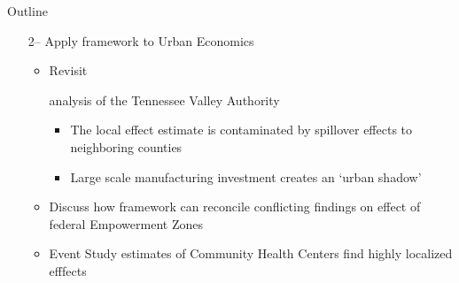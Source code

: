 \documentclass[aspectratio=169]{beamer}
\begin{document}
\begin{frame}{Outline}
    \begin{itemize}
        \item[2--] Apply framework to Urban Economics
        \begin{itemize}
            \item Revisit \begin{citecolor}\citet{Kline_Moretti_2014a}\end{citecolor} analysis of the Tennessee Valley Authority
            
            \begin{itemize}
                \vspace{2.5mm}
                \item The local effect estimate is contaminated by spillover effects to neighboring counties \begin{citecolor}\citep{Kline_Moretti_2014b}\end{citecolor}
                
                \vspace{2.5mm}
                \item Large scale manufacturing investment creates an `urban shadow' \begin{citecolor}\citep{Cuberes_Desmet_Rappaport_2021,Fujita_Krugman_Venables_2001}\end{citecolor}
            \end{itemize}
            
            \vspace{2.5mm}
            \item Discuss how framework can reconcile conflicting findings on effect of federal Empowerment Zones \begin{citecolor}\citep{Busso_Gregory_Kline_2013,Neumark_Kolko_2010}\end{citecolor}
            
            \vspace{2.5mm}
            \item Event Study estimates of Community Health Centers find highly localized efffects \begin{citecolor}\citep{Bailey_Goodman_Bacon_2015}\end{citecolor}
        \end{itemize}
    \end{itemize} 
\end{frame}
\end{document}
